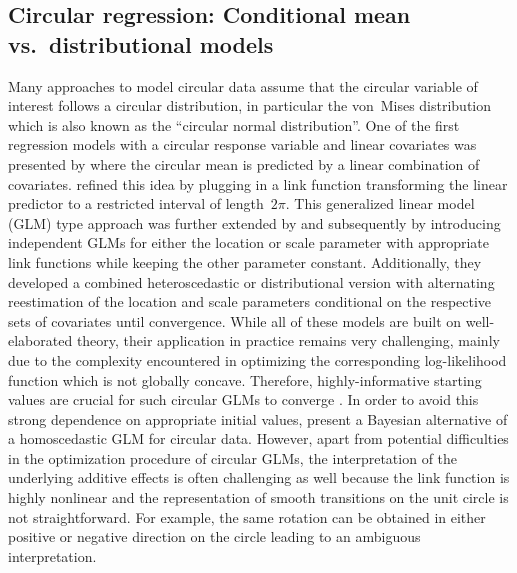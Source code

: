 \documentclass{statsoc}
\begin{document}
\subsection[Circular regression: Conditional mean vs. distributional models]{Circular regression: Conditional mean vs.\ distributional models}

Many approaches to model circular data assume that the circular variable of
interest follows a circular distribution, in particular the von~Mises
distribution which is also known as the ``circular normal distribution''. One
of the first regression models with a circular response variable and linear
covariates was presented by \cite{Gould:1969} where the circular mean is
predicted by a linear combination of covariates. \cite{Johnson+Wehrly:1978}
refined this idea by plugging in a link function transforming the linear
predictor to a restricted interval of length~$2\pi$. This generalized linear
model (GLM) type approach was further extended by \cite{Fisher+Lee:1992} and
subsequently by \cite{Fisher:1993} introducing independent GLMs for either the
location or scale parameter with appropriate link functions while keeping the
other parameter constant. Additionally, they developed a combined
heteroscedastic or distributional version with alternating reestimation of the
location and scale parameters conditional on the respective sets of covariates
until convergence. While all of these models are built on well-elaborated
theory, their application in practice remains very challenging, mainly due to
the complexity encountered in optimizing the corresponding log-likelihood
function which is not globally concave. Therefore, highly-informative starting
values are crucial for such circular GLMs to converge
\citep{Pewsey+Neuhaeuser+Ruxton:2013, Gill+Hangartner:2010}. In order to avoid
this strong dependence on appropriate initial values,
\cite{Mulder+Klugkist:2017} present a Bayesian alternative of a homoscedastic
GLM for circular data. However, apart from potential difficulties in the
optimization procedure of circular GLMs, the interpretation of the underlying
additive effects is often challenging as well because the link function is
highly nonlinear and the representation of smooth transitions on the unit
circle is not straightforward. For example, the same rotation can be obtained
in either positive or negative direction on the circle leading to an ambiguous
interpretation.
\end{document}
